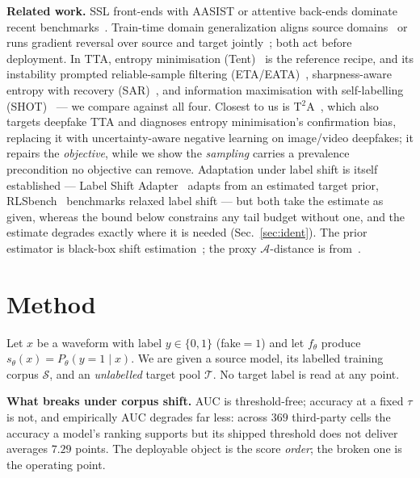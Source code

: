 \documentclass[10pt,letterpaper]{article}
\begin{document}
\textbf{Related work.} SSL front-ends with AASIST or attentive back-ends dominate
recent benchmarks~\cite{wav2vec2aug,xlsrsls,aasist,rawnet2,wav2dftsl}. Train-time domain
generalization aligns source domains~\cite{asdg} or runs gradient reversal over
source and target jointly~\cite{dann}; both act before deployment. In TTA,
entropy minimisation (Tent)~\cite{tent} is the reference recipe, and its
instability prompted reliable-sample filtering (ETA/EATA)~\cite{eata},
sharpness-aware entropy with recovery (SAR)~\cite{sar}, and information maximisation with
self-labelling (SHOT)~\cite{shot} --- we compare against all four. Closest to us is T$^2$A~\cite{t2a}, which also targets deepfake
TTA and diagnoses entropy minimisation's confirmation bias, replacing it with
uncertainty-aware negative learning on image/video deepfakes; it repairs the
\emph{objective}, while we show the \emph{sampling} carries a prevalence
precondition no objective can remove. Adaptation under label shift is itself established --- Label Shift
Adapter~\cite{lsa} adapts from an estimated target prior, RLSbench~\cite{rlsbench}
benchmarks relaxed label shift --- but both take the estimate as given, whereas
the bound below constrains any tail budget without one, and the estimate degrades
exactly where it is needed (Sec.~\ref{sec:ident}). The prior estimator is
black-box shift estimation~\cite{bbse}; the proxy $\mathcal{A}$-distance
is from~\cite{bendavid}.

\section{Method}
\label{sec:method}
Let $x$ be a waveform with label $y\in\{0,1\}$ (fake$=1$) and let $f_\theta$
produce $s_\theta(x)=P_\theta(y{=}1\mid x)$. We are given a source model, its
labelled training corpus $\mathcal{S}$, and an \emph{unlabelled} target pool
$\mathcal{T}$. No target label is read at any point.

\textbf{What breaks under corpus shift.} AUC is threshold-free; accuracy at a
fixed $\tau$ is not, and empirically AUC degrades far less: across $369$
third-party cells the accuracy a model's ranking supports but its shipped
threshold does not deliver averages $7.29$ points. The deployable object is the
score \emph{order}; the broken one is the operating point.
\end{document}
